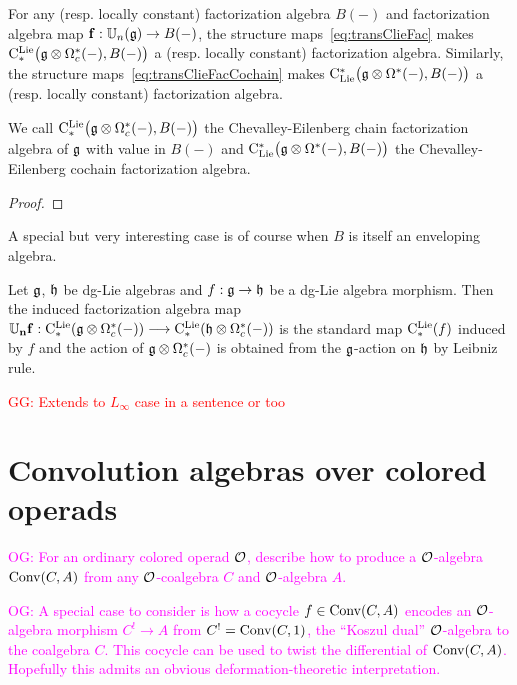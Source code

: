 \documentclass[11pt]{amsart}
\numberwithin{equation}{section}
\def\owen{\textcolor{magenta}{OG: }\textcolor{magenta}}
\def\greg{\textcolor{red}{GG: }\textcolor{red}}
\begin{document}
\begin{lmm}\label{L:ClieFacDef} For any (resp. locally constant) factorization algebra $B(-)$ and factorization algebra map $\mathbf{f}:\mathbb U_n(\mathfrak g) \to B(-)$, 
 the structure maps~\eqref{eq:transClieFac} makes $ {\rm C}^{\rm Lie}_*\big(\mathfrak g \otimes \Omega^*_c(-), B(-) \big)$ a (resp. locally constant) factorization algebra.
 Similarly, the structure maps~\eqref{eq:transClieFacCochain} makes 
 $ {\rm C}_{\rm Lie}^*\big(\mathfrak g \otimes \Omega^*(-), B(-) \big)$ a (resp. locally constant) factorization algebra.
\end{lmm}
\begin{dfn}\label{dfn:CEofFact}
We {call   ${\rm C}^{\rm Lie}_*\big(\mathfrak g \otimes \Omega^*_c(-), B(-) \big)$ the Chevalley-Eilenberg chain factorization algebra of $\mathfrak g$ with value in $B(-)$} 
and ${\rm C}_{\rm Lie}^*\big(\mathfrak g \otimes \Omega^*(-), B(-) \big)$ the Chevalley-Eilenberg cochain factorization algebra.
\end{dfn}
\begin{proof}
 
\end{proof}


A special but very interesting case is of course when $B$ is itself an enveloping algebra. 
\begin{cor}
 Let $\mathfrak g$, $\mathfrak h$ be dg-Lie algebras and $f:\mathfrak g\to \mathfrak h$ be a dg-Lie algebra morphism. 
 Then the induced factorization algebra map $\mathbf{\mathbb U_n f}:  {\rm C}^{\rm Lie}_*( \mathfrak g \otimes \Omega^*_c(-)) \longrightarrow  {\rm C}^{\rm Lie}_*( \mathfrak h \otimes \Omega^*_c(-)) $
 is the standard map ${\rm C}^{\rm Lie}_*(f)$ induced by $f$ and the action of $\mathfrak g  \otimes \Omega^*_c(-)$ is obtained from the $\mathfrak g$-action on $\mathfrak h$ by Leibniz rule.
\end{cor}
\begin{rmk}\greg{Extends to $L_\infty$ case in a sentence or too}
\end{rmk}

\section{Convolution algebras over colored operads}

\def\conv{{\rm Conv}}

\owen{For an ordinary colored operad $\mathcal O$, describe how to produce a $\mathcal O$-algebra $\conv(C,A)$ from any $\mathcal O$-coalgebra $C$ and $\mathcal O$-algebra $A$.}

\owen{A special case to consider is how a cocycle $f \in \conv(C,A)$ encodes an $\mathcal O$-algebra morphism $C^! \to A$ from $C^! = \conv(C,1)$, the ``Koszul dual'' $\mathcal O$-algebra to the coalgebra $C$. This cocycle can be used to twist the differential of $\conv(C,A)$. Hopefully this admits an obvious deformation-theoretic interpretation.}
\end{document}
